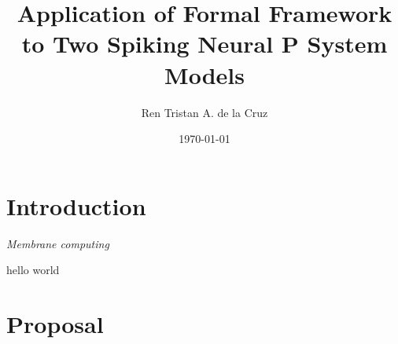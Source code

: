 \documentclass[12pt,A4]{article}
\title
{
   Application of Formal Framework to Two Spiking Neural P System Models 
}
\author
{
   Ren Tristan A. de la Cruz
}
\date
{
   \today
}
\begin{document}
\maketitle


\section{Introduction}

\emph{Membrane computing}

\cite{verlan-2020-ff}

hello world


\section{Proposal}






\end{document}
